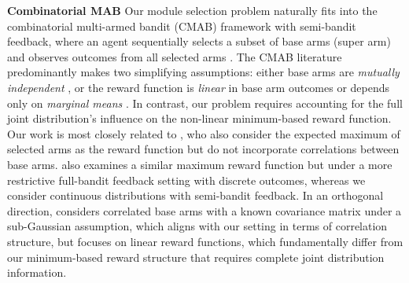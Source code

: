 \documentclass[opre,sglanonrev]{informs4}
\begin{document}
\textbf{Combinatorial MAB} Our module selection problem naturally fits into the combinatorial multi-armed bandit (CMAB) framework with semi-bandit feedback, where an agent sequentially selects a subset of base arms (super arm) and observes outcomes from all selected arms \citep{pmlr-v28-chen13a}. The CMAB literature predominantly makes two simplifying assumptions: either base arms are \emph{mutually independent} \citep{10.5555/3737916.3740755, Combes2015CombinatorialBR, 10.1145/3410220.3453926}, or the reward function is \emph{linear} in base arm outcomes or depends only on \emph{marginal means} \citep{Demirel2021CombinatorialGP, Kveton2015CombinatorialCB}. In contrast, our problem requires accounting for the full joint distribution's influence on the non-linear minimum-based reward function. Our work is most closely related to \citep{Chen2016CombinatorialMB}, who also consider the expected maximum of selected arms as the reward function but do not incorporate correlations between base arms. \citep{Wang2023CombinatorialBF} also examines a similar maximum reward function but under a more restrictive full-bandit feedback setting with discrete outcomes, whereas we consider continuous distributions with semi-bandit feedback. In an orthogonal direction, \citep{Degenne2016CombinatorialSW} considers correlated base arms with a known covariance matrix under a sub-Gaussian assumption, which aligns with our setting in terms of correlation structure, but focuses on linear reward functions, which fundamentally differ from our minimum-based reward structure that requires complete joint distribution information.
\end{document}
